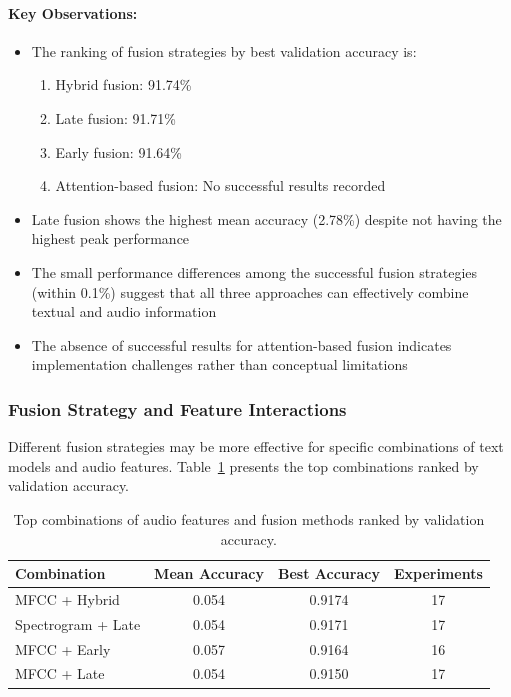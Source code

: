 \documentclass[12pt]{article}
\begin{document}
\paragraph{Key Observations:}
\begin{itemize}
    \item The ranking of fusion strategies by best validation accuracy is:
    \begin{enumerate}
        \item Hybrid fusion: 91.74\%
        \item Late fusion: 91.71\%
        \item Early fusion: 91.64\%
        \item Attention-based fusion: No successful results recorded
    \end{enumerate}
    
    \item Late fusion shows the highest mean accuracy (2.78\%) despite not having the highest peak performance
    
    \item The small performance differences among the successful fusion strategies (within 0.1\%) suggest that all three approaches can effectively combine textual and audio information
    
    \item The absence of successful results for attention-based fusion indicates implementation challenges rather than conceptual limitations
\end{itemize}

\subsubsection{Fusion Strategy and Feature Interactions}
Different fusion strategies may be more effective for specific combinations of text models and audio features. Table~\ref{tab:feature_fusion_combinations} presents the top combinations ranked by validation accuracy.

\begin{table}[h]
\centering
\begin{tabular}{|l|c|c|c|}
\hline
\textbf{Combination} & \textbf{Mean Accuracy} & \textbf{Best Accuracy} & \textbf{Experiments} \\
\hline
MFCC + Hybrid & 0.054 & 0.9174 & 17 \\
\hline
Spectrogram + Late & 0.054 & 0.9171 & 17 \\
\hline
MFCC + Early & 0.057 & 0.9164 & 16 \\
\hline
MFCC + Late & 0.054 & 0.9150 & 17 \\
\hline
\end{tabular}
\caption{Top combinations of audio features and fusion methods ranked by validation accuracy.}
\label{tab:feature_fusion_combinations}
\end{table}
\end{document}
